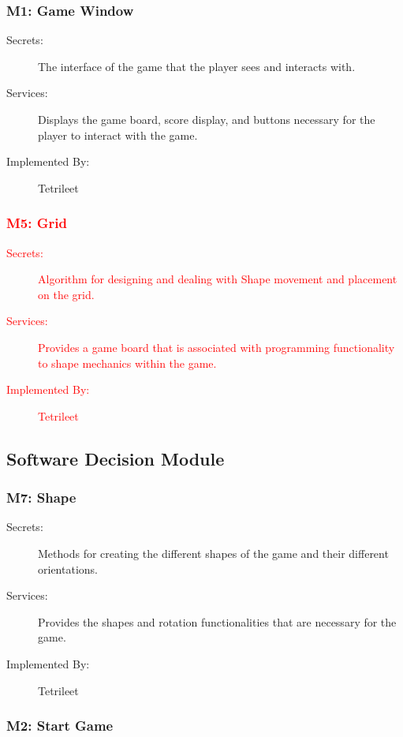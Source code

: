 \documentclass[12pt, titlepage]{article}
\begin{document}
\subsubsection{M1: Game Window}
\begin{description}
\item[Secrets:]The interface of the game that the player sees and interacts with.
\item[Services:]Displays the game board, score display, and buttons necessary for the player to interact with the game.
\item[Implemented By:] Tetrileet
\end{description}

\textcolor{red}{
\subsubsection{M5: Grid}
\begin{description}
\item[Secrets:] Algorithm for designing and dealing with Shape movement and placement on the grid.
\item[Services:] Provides a game board that is associated with programming functionality to shape mechanics within the game.
\item[Implemented By:] Tetrileet
\end{description}}

\subsection{Software Decision Module}

\subsubsection{M7: Shape}

\begin{description}
\item[Secrets:] Methods for creating the different shapes of the game and their different orientations.
\item[Services:]Provides the shapes and rotation functionalities that are necessary for the game.
\item[Implemented By:] Tetrileet
\end{description}

\subsubsection{M2: Start Game}
\end{document}
